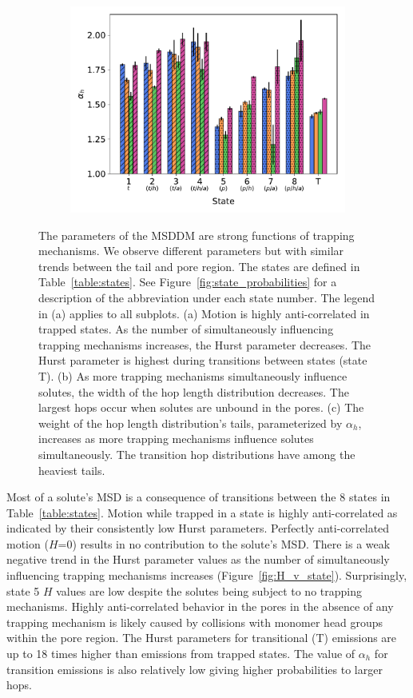 \documentclass[12pt]{article}
\begin{document}
\begin{figure}
\begin{subfigure}{0.325\textwidth}
  \includegraphics[width=\textwidth]{alpha_v_state.pdf}
  \caption{}\label{fig:alpha_v_state}
  \end{subfigure}
  \caption{The parameters of the MSDDM are strong functions of trapping mechanisms.
  We observe different parameters but with similar trends between the tail and pore
  region. The states are defined in Table~\ref{table:states}. See Figure~\ref{fig:state_probabilities}
  for a description of the abbreviation under each state number. The legend in (a) applies to all subplots. (a) Motion is
  highly anti-correlated in trapped states. As the number of simultaneously influencing
  trapping mechanisms increases, the Hurst parameter decreases. The Hurst parameter is
  highest during transitions between states (state T). (b) As more trapping mechanisms
  simultaneously influence solutes, the width of the hop length distribution decreases.
  The largest hops occur when solutes are unbound in the pores. (c) The weight of the 
  hop length distribution's tails, parameterized by $\alpha_h$, increases as more trapping
  mechanisms influence solutes simultaneously. The transition hop distributions have
  among the heaviest tails.}\label{fig:msddm_parameters}
  \end{figure}

  Most of a solute's MSD is a consequence of transitions between the 8 states
  in Table~\ref{table:states}. Motion while trapped in a state is highly 
  anti-correlated as indicated by their consistently low Hurst parameters.
  Perfectly anti-correlated motion ($H$=0) results in no contribution to the solute's
  MSD. There is a weak negative trend in the Hurst parameter values as the number
  of simultaneously influencing trapping mechanisms increases (Figure~\ref{fig:H_v_state}). 
  Surprisingly, state 5 $H$ values are low despite the solutes being subject to no
  trapping mechanisms. Highly anti-correlated behavior in the pores in the absence of
  any trapping mechanism is likely caused by collisions with monomer head groups 
  within the pore region. The Hurst parameters for transitional (T) emissions are up to 
  18 times higher than emissions from trapped states. The value of $\alpha_h$ for 
  transition emissions is also relatively low giving higher probabilities to larger hops.
  
\end{document}

